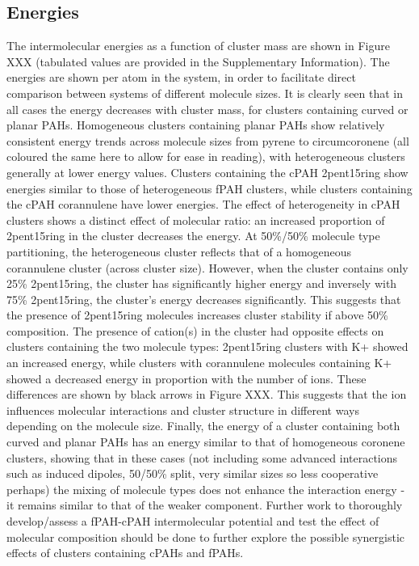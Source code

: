 \subsection{Energies}
The intermolecular energies as a function of cluster mass are shown in Figure XXX (tabulated values are provided in the Supplementary Information).  The energies are shown per atom in the system, in order to facilitate direct comparison between systems of different molecule sizes.
It is clearly seen that in all cases the energy decreases with cluster mass, for clusters containing curved or planar PAHs.  Homogeneous clusters containing planar PAHs show relatively consistent energy trends across molecule sizes from pyrene to circumcoronene (all coloured the same here to allow for ease in reading), with heterogeneous clusters generally at lower energy values.  Clusters containing the cPAH 2pent15ring show energies similar to those of heterogeneous fPAH clusters, while clusters containing the cPAH corannulene have lower energies.
The effect of heterogeneity in cPAH clusters shows a distinct effect of molecular ratio: an increased proportion of 2pent15ring in the cluster decreases the energy. At 50\%/50\% molecule type partitioning, the heterogeneous cluster reflects that of a homogeneous corannulene cluster (across cluster size). However, when the cluster contains only 25\% 2pent15ring, the cluster has significantly higher energy and inversely with 75\% 2pent15ring, the cluster's energy decreases significantly.  This suggests that the presence of 2pent15ring molecules increases cluster stability if above 50\% composition.
The presence of cation(s) in the cluster had opposite effects on clusters containing the two molecule types: 2pent15ring clusters with K+ showed an increased energy, while clusters with corannulene molecules containing K+ showed a decreased energy in proportion with the number of ions.  These differences are shown by black arrows in Figure XXX. This suggests that the ion influences molecular interactions and cluster structure in different ways depending on the molecule size.
Finally, the energy of a cluster containing both curved and planar PAHs has an energy similar to that of homogeneous coronene clusters, showing that in these cases (not including some advanced interactions such as induced dipoles, 50/50\% split, very similar sizes so less cooperative perhaps) the mixing of molecule types does not enhance the interaction energy - it remains similar to that of the weaker component.  Further work to thoroughly develop/assess a fPAH-cPAH intermolecular potential and test the effect of molecular composition should be done to further explore the possible synergistic effects of clusters containing cPAHs and fPAHs.

